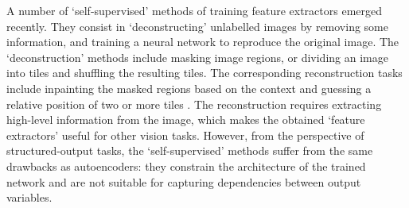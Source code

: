 \documentclass[a4paper]{article}
\begin{document}
A number of `self-supervised' methods of training feature extractors \cite{Doersch2015,Pathak2016,Noroozi2016} emerged recently. They consist in `deconstructing' unlabelled images by removing some information, and training a neural network to reproduce the original image. The `deconstruction' methods include masking image regions, or dividing an image into tiles and shuffling the resulting tiles. The corresponding reconstruction tasks include inpainting the masked regions based on the context \cite{Pathak2016} and guessing a relative position of two or more tiles \cite{Doersch2015,Noroozi2016}. The reconstruction requires extracting high-level information from the image, which makes the obtained `feature extractors' useful for other vision tasks. However, from the perspective of structured-output tasks, the `self-supervised' methods suffer from the same drawbacks as autoencoders: they constrain the architecture of the trained network and are not suitable for capturing dependencies between output variables.
\end{document}
